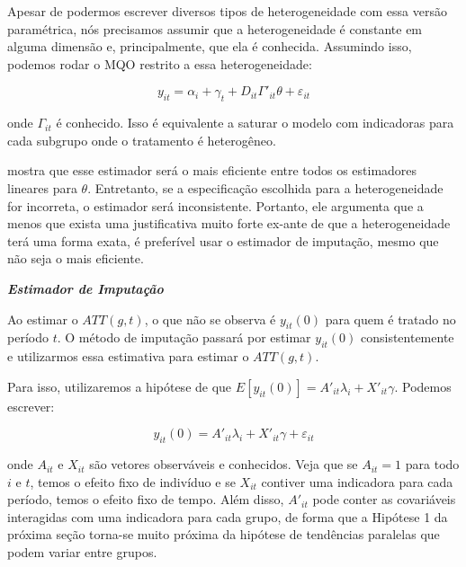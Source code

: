 \documentclass[portugues]{article}
\begin{document}
Apesar de podermos escrever diversos tipos de heterogeneidade com essa versão paramétrica, nós precisamos assumir que a heterogeneidade é constante em alguma dimensão e, principalmente, que ela é conhecida. Assumindo isso, podemos rodar o MQO restrito a essa heterogeneidade:

\begin{equation}\label{eq:borusyak_TWFE}
    y_{it} = \alpha_i + \gamma_t + D_{it} \Gamma'_{it} \theta + \varepsilon_{it}
\end{equation}

\noindent onde $\Gamma_{it}$ é conhecido. Isso é equivalente a saturar o modelo com indicadoras para cada subgrupo onde o tratamento é heterogêneo.

\citet{borusyak2024revisiting} mostra que esse estimador será o mais eficiente entre todos os estimadores lineares para $\theta$. Entretanto, se a especificação escolhida para a heterogeneidade for incorreta, o estimador será inconsistente. Portanto, ele argumenta que a menos que exista uma justificativa muito forte ex-ante de que a heterogeneidade terá uma forma exata, é preferível usar o estimador de imputação, mesmo que não seja o mais eficiente.

\vspace{5mm}

{\large \textbf{\textit{Estimador de Imputação}}}

\vspace{2.5mm}

Ao estimar o $ATT(g,t)$, o que não se observa é $y_{it}(0)$ para quem é tratado no período $t$. O método de imputação passará por estimar $y_{it}(0)$ consistentemente e utilizarmos essa estimativa para estimar o $ATT(g,t)$.

Para isso, utilizaremos a hipótese de que $E[y_{it}(0)] = A'_{it} \lambda_i + X'_{it}\gamma$. Podemos escrever:

\begin{equation}\label{eq:borusyak}
    y_{it}(0) = A'_{it} \lambda_i + X'_{it}\gamma + \varepsilon_{it}
\end{equation}

\noindent onde $A_{it}$ e $X_{it}$ são vetores observáveis e conhecidos. Veja que se $A_{it} = 1$ para todo $i$ e $t$, temos o efeito fixo de indivíduo e se $X_{it}$ contiver uma indicadora para cada período, temos o efeito fixo de tempo. Além disso, $A'_{it}$ pode conter as covariáveis interagidas com uma indicadora para cada grupo, de forma que a Hipótese 1 da próxima seção torna-se muito próxima da hipótese de tendências paralelas que podem variar entre grupos.
\end{document}
